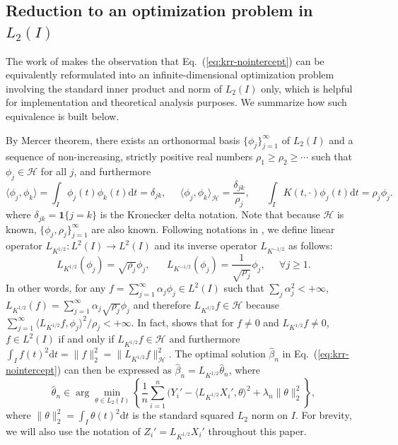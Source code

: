\documentclass[aos]{imsart}
\renewcommand{\hat}{\widehat}
\newcommand{\vct}{\boldsymbol}
\newcommand{\ud}{\mathrm d}
\newcommand{\mH}{\mathcal H}
\theoremstyle{plain}
\theoremstyle{definition}
\theoremstyle{definition}
\begin{document}
\subsection{Reduction to an optimization problem in $L_2(I)$}

The work of \cite{cai2012minimax} makes the observation that Eq.~(\ref{eq:krr-nointercept}) can be equivalently reformulated into an infinite-dimensional optimization problem
involving the standard inner product and norm of $L_2(I)$ only, which is helpful for implementation and theoretical analysis purposes.
We summarize how such equivalence is built below.

By Mercer theorem, there exists an orthonormal basis $\{\phi_j\}_{j=1}^{\infty}$ of $L_2(I)$
and a sequence of non-increasing, strictly positive real numbers $\rho_1\geq\rho_2\geq\cdots$ such that $\phi_j\in\mH$ for all $j$, and furthermore
$$
\langle\phi_j,\phi_k\rangle = \int_I \phi_j(t)\phi_k(t)\ud t = \delta_{jk},\;\;\;\;\;\langle\phi_j,\phi_k\rangle_{\mH}= \frac{\delta_{jk}}{\rho_j},\;\;\;\;\;\;\int_I K(t,\cdot)\phi_j(t)\ud t=\rho_j\phi_j.
$$
where $\delta_{jk}=\vct 1\{j=k\}$ is the Kronecker delta notation.
Note that because $\mH$ is known, $\{\phi_j,\rho_j\}_{j=1}^{\infty}$ are also known.
Following notations in \citep{cai2012minimax}, we define linear operator $L_{K^{1/2}}:L^2(I)\to L^2(I)$ and its inverse operator $L_{K^{-1/2}}$ as follows:
$$
L_{K^{1/2}}(\phi_j) = \sqrt{\rho_j}\phi_j,\;\;\;\;\;\; L_{K^{-1/2}}(\phi_j) = \frac{1}{\sqrt{\rho_j}}\phi_j,\;\;\;\;\;\forall j\geq 1.
$$
In other words, for any $f=\sum_{j=1}^{\infty}\alpha_j\phi_j\in L^2(I)$ such that $\sum_j\alpha_j^2<+\infty$, $L_{K^{1/2}}(f)=\sum_{j=1}^{\infty}\alpha_j\sqrt{\rho_j}\phi_j$
and therefore $L_{K^{1/2}}f\in\mH$ because $\sum_{j=1}^{\infty}\langle L_{K^{1/2}}f,\phi_j\rangle^2/\rho_j <+\infty$.
In fact, \citep[Proposition 2]{yuan2010reproducing} shows that for $f\neq 0$ and $L_{K^{1/2}}f\neq 0$, $f\in L^2(I)$ if and only if $L_{K^{1/2}}f\in\mH$ and furthermore $\int_I f(t)^2\ud t=\|f\|_2^2=\|L_{K^{1/2}}f\|_\mH^2$.
The optimal solution $\hat\beta_n$ in Eq.~(\ref{eq:krr-nointercept}) can then be expressed as $\hat\beta_n = L_{K^{1/2}}\hat\theta_n$, where
\begin{equation}
\hat\theta_n \in \arg\min_{\theta\in L_2(I)}\left\{\frac{1}{n}\sum_{i=1}^n (Y_i'-\langle L_{K^{1/2}}X_i', \theta\rangle^2 + \lambda_n\|\theta\|_2^2\right\},
\label{eq:krr-nointercept-l2}
\end{equation}
where $\|\theta\|_2^2 =\int_I \theta(t)^2\ud t$ is the standard squared $L_2$ norm on $I$.
For brevity, we will also use the notation of $Z_i' = L_{K^{1/2}}X_i'$ throughout this paper.
\end{document}
